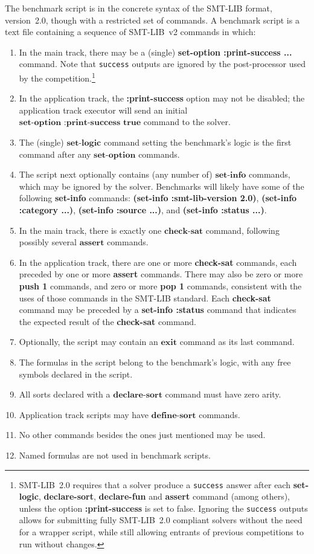 \documentclass[12pt]{article}
\newcommand{\akey}[1]{\textbf{#1}}
\begin{document}
The benchmark script is in the concrete syntax of the SMT-LIB format,
version~2.0, though with a restricted set of commands.  A benchmark
script is a text file containing a sequence of SMT-LIB~v2 commands in
which:
%
\begin{enumerate}
\item In the main track, there may be a (single) \akey{set-option
  :print-success ...} command.  Note that {\tt success} outputs are
  ignored by the post-processor used by the
  competition.\footnote{SMT-LIB~2.0 requires that a solver produce a
    \texttt{success} answer after each \akey{set-logic},
    \akey{declare-sort}, \akey{declare-fun} and \akey{assert} command
    (among others), unless the option \akey{:print-success} is set to
    false.  Ignoring the \texttt{success} outputs allows for
    submitting fully SMT-LIB~2.0 compliant solvers without the need
    for a wrapper script, while still allowing entrants of previous
    competitions to run without changes.}
\item In the application track, the \akey{:print-success} option may
  not be disabled; the application track executor will send an initial
  $\akey{set-option :print-success true}$ command to the solver.
\item The (single) $\akey{set-logic}$ command setting the benchmark's
  logic is the first command after any $\akey{set-option}$ commands.
\item The script next optionally contains (any number of)
  $\akey{set-info}$ commands, which may be ignored by the
  solver. Benchmarks will likely have some of the following
  \akey{set-info} commands: \akey{(set-info :smt-lib-version 2.0)},
  \akey{(set-info :category ...)}, \akey{(set-info :source ...)}, and
  \akey{(set-info :status ...)}.
\item In the main track, there is exactly one $\akey{check-sat}$
  command, following possibly several $\akey{assert}$ commands.
\item In the application track, there are one or more \akey{check-sat}
  commands, each preceded by one or more \akey{assert} commands.
  There may also be zero or more \akey{push 1} commands, and zero or
  more \akey{pop 1} commands, consistent with the uses of those
  commands in the SMT-LIB standard. Each \akey{check-sat} command may
  be preceded by a \akey{set-info :status} command that indicates the
  expected result of the \akey{check-sat} command.
\item Optionally, the script may contain an $\akey{exit}$ command as
  its last command.
\item The formulas in the script belong to the benchmark's logic, with
  any free symbols declared in the script.
\item All sorts declared with a $\akey{declare-sort}$ command must
  have zero arity.
\item Application track scripts may have $\akey{define-sort}$
  commands.
\item No other commands besides the ones just mentioned may be used.
\item Named formulas are not used in benchmark scripts.
\end{enumerate}
\end{document}
